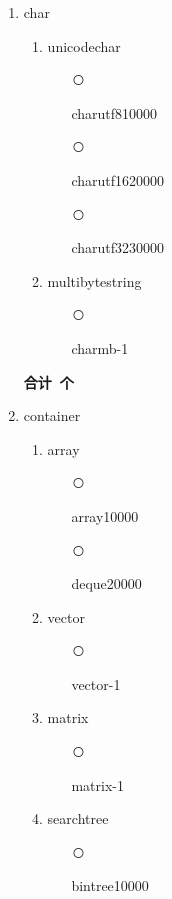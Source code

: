\documentclass[11pt]{ctexrep}
\newcounter{typelist}
\newcommand{\circnum}{\addtocounter{typelist}{1}\textcircled{\tiny\thetypelist}}
\begin{document}
\begin{enumerate}
\begin{enumerate}
\begin{enumerate}
		\item[\circnum] stringutf16\hfill 20000
		\item[\circnum] stringutf32\hfill 30000
		\end{enumerate}
	\item multibytestring
		\begin{enumerate}
		\item[\circnum] stringmb\hfill -1
		\end{enumerate}
	\end{enumerate}
	\textbf{合计\thetypelist\ 个}
\item char
\setcounter{typelist}{0}
	\begin{enumerate}
	\item unicodechar
		\begin{enumerate}
		\item[\circnum] charutf8\hfill 10000
		\item[\circnum] charutf16\hfill 20000
		\item[\circnum] charutf32\hfill 30000
		\end{enumerate}
	\item multibytestring
		\begin{enumerate}
		\item[\circnum] charmb\hfill -1
		\end{enumerate}
	\end{enumerate}
	\textbf{合计\thetypelist\ 个}
\item container
\setcounter{typelist}{0}
	\begin{enumerate}
	\item array
		\begin{enumerate}
		\item[\circnum] array\hfill 10000
		\item[\circnum] deque\hfill 20000
		\end{enumerate}
	\item vector
		\begin{enumerate}
		\item[\circnum] vector\hfill -1 
		\end{enumerate}
	\item matrix
		\begin{enumerate}
		\item[\circnum] matrix\hfill -1 
		\end{enumerate}
	\item searchtree
		\begin{enumerate}
		\item[\circnum] bintree\hfill 10000

\end{enumerate}
\end{enumerate}
\end{enumerate}
\end{document}
